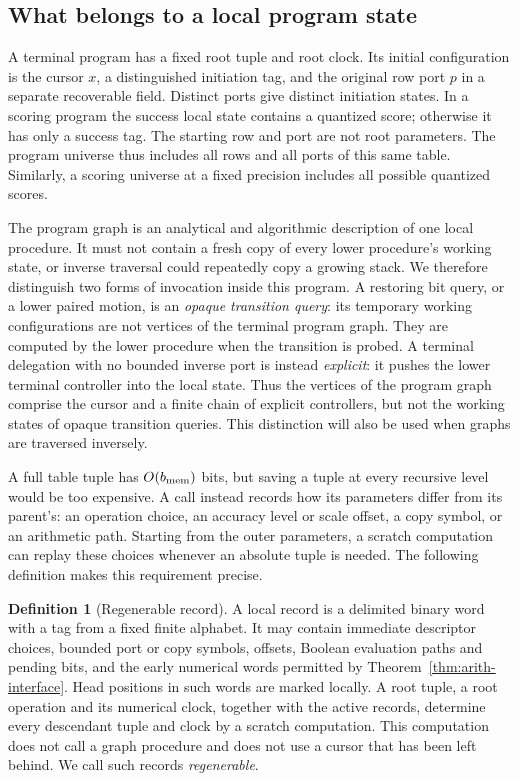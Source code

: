\documentclass[11pt]{article}
\numberwithin{equation}{section}
\theoremstyle{definition}
\newtheorem{definition}[theorem]{Definition}
\theoremstyle{remark}
\begin{document}
\subsection{What belongs to a local program state}\label{sec:ctrl-graphs}

A terminal program has a fixed root tuple and root clock.  Its initial
configuration is the cursor $x$, a distinguished initiation tag, and the
original row port $p$ in a separate recoverable field.  Distinct ports
give distinct initiation states.  In a scoring program the success local state contains a
quantized score; otherwise it has only a success tag.  The starting row
and port are not root parameters.  The program universe thus includes
all rows and all ports of this same table.  Similarly, a scoring
universe at a fixed precision includes all possible quantized scores.

The program graph is an analytical and algorithmic description of one local procedure. It must not contain a fresh copy of every lower procedure's working state, or inverse traversal could repeatedly copy a growing stack. We therefore distinguish two forms of invocation inside this program.  A
restoring bit query, or a lower paired motion, is an \emph{opaque
transition query}: its temporary working configurations are not vertices
of the terminal program graph.  They are computed by the lower
procedure when the transition is probed.  A terminal delegation with no
bounded inverse port is instead \emph{explicit}: it pushes the lower
terminal controller into the local state.  Thus the vertices of the
program graph comprise the cursor and a finite chain of explicit
controllers, but not the working states of opaque transition queries.
This distinction will also be used when graphs are traversed inversely.

A full table tuple has $O({b_{\rm mem}})$ bits, but saving a tuple at every recursive level would be too expensive. A call instead records how its parameters differ from its parent's: an operation choice, an accuracy level or scale offset, a copy symbol, or an arithmetic path. Starting from the outer parameters, a scratch computation can replay these choices whenever an absolute tuple is needed. The following definition makes this requirement precise.

\begin{definition}[Regenerable record]\label{def:ctrl-record}
A local record is a delimited binary word with a tag from a fixed finite
alphabet.  It may contain immediate descriptor choices, bounded port or
copy symbols, offsets, Boolean evaluation paths and pending bits, and the
early numerical words permitted by Theorem~\ref{thm:arith-interface}.
Head positions in such words are marked locally.  A root tuple, a root
operation and its numerical clock, together with the active records,
determine every descendant tuple and clock by a scratch computation.
This computation does not call a graph procedure and does not use a
cursor that has been left behind.  We call such records
\emph{regenerable}.
\end{definition}
\end{document}
